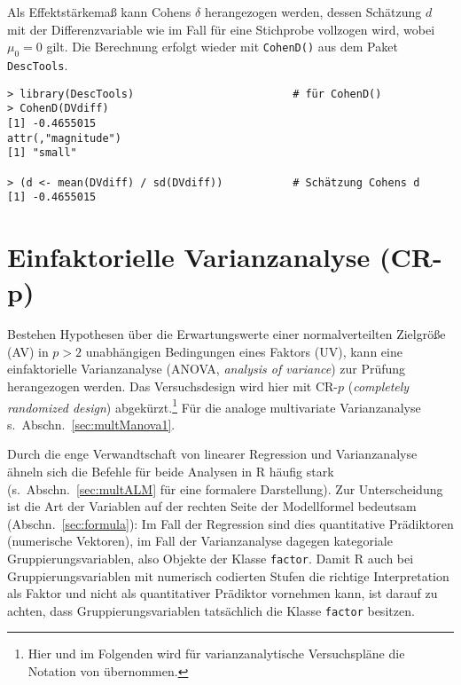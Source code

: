 Als Effektstärkemaß kann Cohens $\delta$ herangezogen werden, dessen Schätzung $d$ mit der Differenzvariable wie im Fall für eine Stichprobe vollzogen wird, wobei $\mu_{0} = 0$ gilt. Die Berechnung erfolgt wieder mit \lstinline!CohenD()! aus dem Paket \lstinline!DescTools!.
\begin{lstlisting}
> library(DescTools)                         # für CohenD()
> CohenD(DVdiff)
[1] -0.4655015
attr(,"magnitude")
[1] "small"

> (d <- mean(DVdiff) / sd(DVdiff))           # Schätzung Cohens d
[1] -0.4655015
\end{lstlisting}

\section[Einfaktorielle Varianzanalyse (CR-\texorpdfstring{$p$}{p})]{Einfaktorielle Varianzanalyse (CR-$\bm{p}$)}
\label{sec:CRp}

Bestehen Hypothesen über die Erwartungswerte einer normalverteilten Zielgröße (AV) in $p > 2$ unabhängigen Bedingungen eines Faktors (UV), kann eine einfaktorielle Varianzanalyse (ANOVA, \emph{analysis of variance}) zur Prüfung herangezogen werden. Das Versuchsdesign wird hier mit CR-$p$ (\emph{completely randomized design}) abgekürzt.\footnote{Hier und im Folgenden wird für varianzanalytische Versuchspläne die Notation von  übernommen.} Für die analoge multivariate Varianzanalyse s.\ Abschn.\ \ref{sec:multManova1}.

Durch die enge Verwandtschaft von linearer Regression und Varianzanalyse ähneln sich die Befehle für beide Analysen in R häufig stark (s.\ Abschn.\ \ref{sec:multALM} für eine formalere Darstellung). Zur Unterscheidung ist die Art der Variablen auf der rechten Seite der Modellformel bedeutsam (Abschn.\ \ref{sec:formula}): Im Fall der Regression sind dies quantitative Prädiktoren (numerische Vektoren), im Fall der Varianzanalyse dagegen kategoriale Gruppierungsvariablen, also Objekte der Klasse \lstinline!factor!. Damit R auch bei Gruppierungsvariablen mit numerisch codierten Stufen die richtige Interpretation als Faktor und nicht als quantitativer Prädiktor vornehmen kann, ist darauf zu achten, dass Gruppierungsvariablen tatsächlich die Klasse \lstinline!factor! besitzen.

